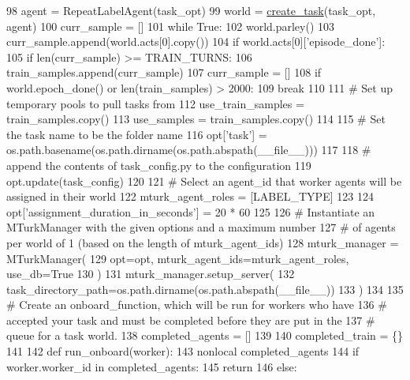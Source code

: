 \begin{DoxyCode}
98     agent = RepeatLabelAgent(task\_opt)
99     world = \hyperlink{namespaceparlai_1_1core_1_1worlds_a11923c10b545c7ecc1b08fe2242d9c2c}{create\_task}(task\_opt, agent)
100     curr\_sample = []
101     \textcolor{keywordflow}{while} \textcolor{keyword}{True}:
102         world.parley()
103         curr\_sample.append(world.acts[0].copy())
104         \textcolor{keywordflow}{if} world.acts[0][\textcolor{stringliteral}{'episode\_done'}]:
105             \textcolor{keywordflow}{if} len(curr\_sample) >= TRAIN\_TURNS:
106                 train\_samples.append(curr\_sample)
107             curr\_sample = []
108         \textcolor{keywordflow}{if} world.epoch\_done() \textcolor{keywordflow}{or} len(train\_samples) > 2000:
109             \textcolor{keywordflow}{break}
110 
111     \textcolor{comment}{# Set up temporary pools to pull tasks from}
112     use\_train\_samples = train\_samples.copy()
113     use\_samples = train\_samples.copy()
114 
115     \textcolor{comment}{# Set the task name to be the folder name}
116     opt[\textcolor{stringliteral}{'task'}] = os.path.basename(os.path.dirname(os.path.abspath(\_\_file\_\_)))
117 
118     \textcolor{comment}{# append the contents of task\_config.py to the configuration}
119     opt.update(task\_config)
120 
121     \textcolor{comment}{# Select an agent\_id that worker agents will be assigned in their world}
122     mturk\_agent\_roles = [LABEL\_TYPE]
123 
124     opt[\textcolor{stringliteral}{'assignment\_duration\_in\_seconds'}] = 20 * 60
125 
126     \textcolor{comment}{# Instantiate an MTurkManager with the given options and a maximum number}
127     \textcolor{comment}{# of agents per world of 1 (based on the length of mturk\_agent\_ids)}
128     mturk\_manager = MTurkManager(
129         opt=opt, mturk\_agent\_ids=mturk\_agent\_roles, use\_db=\textcolor{keyword}{True}
130     )
131     mturk\_manager.setup\_server(
132         task\_directory\_path=os.path.dirname(os.path.abspath(\_\_file\_\_))
133     )
134 
135     \textcolor{comment}{# Create an onboard\_function, which will be run for workers who have}
136     \textcolor{comment}{# accepted your task and must be completed before they are put in the}
137     \textcolor{comment}{# queue for a task world.}
138     completed\_agents = []
139 
140     completed\_train = \{\}
141 
142     \textcolor{keyword}{def }run\_onboard(worker):
143         nonlocal completed\_agents
144         \textcolor{keywordflow}{if} worker.worker\_id \textcolor{keywordflow}{in} completed\_agents:
145             \textcolor{keywordflow}{return}
146         \textcolor{keywordflow}{else}:

\end{DoxyCode}
